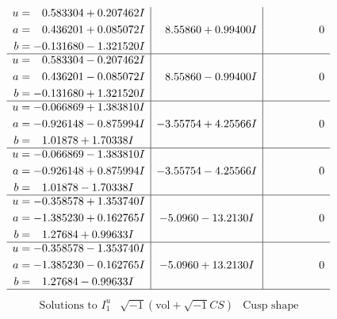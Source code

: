\documentclass[1p]{elsarticle_modified}
\theoremstyle{definition}
\newcommand{\I}{\sqrt{-1}}
\begin{document}
$$\begin{array}{c|c|c}
\begin{aligned}
u &= \phantom{-}0.583304 + 0.207462 I \\
a &= \phantom{-}0.436201 + 0.085072 I \\
b &= -0.131680 - 1.321520 I\end{aligned}
 & \phantom{-}8.55860 + 0.99400 I & \phantom{-0.000000 } 0 \\ \hline\begin{aligned}
u &= \phantom{-}0.583304 - 0.207462 I \\
a &= \phantom{-}0.436201 - 0.085072 I \\
b &= -0.131680 + 1.321520 I\end{aligned}
 & \phantom{-}8.55860 - 0.99400 I & \phantom{-0.000000 } 0 \\ \hline\begin{aligned}
u &= -0.066869 + 1.383810 I \\
a &= -0.926148 - 0.875994 I \\
b &= \phantom{-}1.01878 + 1.70338 I\end{aligned}
 & -3.55754 + 4.25566 I & \phantom{-0.000000 } 0 \\ \hline\begin{aligned}
u &= -0.066869 - 1.383810 I \\
a &= -0.926148 + 0.875994 I \\
b &= \phantom{-}1.01878 - 1.70338 I\end{aligned}
 & -3.55754 - 4.25566 I & \phantom{-0.000000 } 0 \\ \hline\begin{aligned}
u &= -0.358578 + 1.353740 I \\
a &= -1.385230 + 0.162765 I \\
b &= \phantom{-}1.27684 + 0.99633 I\end{aligned}
 & -5.0960 - 13.2130 I & \phantom{-0.000000 } 0 \\ \hline\begin{aligned}
u &= -0.358578 - 1.353740 I \\
a &= -1.385230 - 0.162765 I \\
b &= \phantom{-}1.27684 - 0.99633 I\end{aligned}
 & -5.0960 + 13.2130 I & \phantom{-0.000000 } 0\\
 \hline 
 \end{array}$$\newpage$$\begin{array}{c|c|c}  
\text{Solutions to }I^u_{1}& \I (\text{vol} + \sqrt{-1}CS) & \text{Cusp shape}\\
 \hline 
\begin{aligned}

\end{aligned}
\end{array}$$
\end{document}
